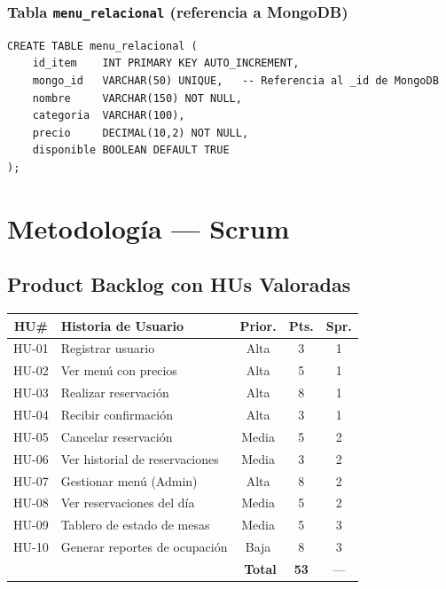 \documentclass[12pt,a4paper]{article}
\begin{document}
\subsubsection{Tabla \texttt{menu\_relacional} (referencia a MongoDB)}
\begin{lstlisting}[caption={SQL --- Tabla menu\_relacional}]
CREATE TABLE menu_relacional (
    id_item    INT PRIMARY KEY AUTO_INCREMENT,
    mongo_id   VARCHAR(50) UNIQUE,   -- Referencia al _id de MongoDB
    nombre     VARCHAR(150) NOT NULL,
    categoria  VARCHAR(100),
    precio     DECIMAL(10,2) NOT NULL,
    disponible BOOLEAN DEFAULT TRUE
);
\end{lstlisting}

\section{Metodología --- Scrum}



\subsection{Product Backlog con HUs Valoradas}

\begin{center}
{\small
\begin{tabular}{cp{7cm}ccc}
\toprule
\rowcolor{grisclaro}
\textbf{HU\#} & \textbf{Historia de Usuario} & \textbf{Prior.} & \textbf{Pts.} & \textbf{Spr.} \\
\midrule
HU-01 & Registrar usuario              & Alta  & 3  & 1 \\
\rowcolor{grisclaro}
HU-02 & Ver menú con precios           & Alta  & 5  & 1 \\
HU-03 & Realizar reservación           & Alta  & 8  & 1 \\
\rowcolor{grisclaro}
HU-04 & Recibir confirmación           & Alta  & 3  & 1 \\
HU-05 & Cancelar reservación           & Media & 5  & 2 \\
\rowcolor{grisclaro}
HU-06 & Ver historial de reservaciones & Media & 3  & 2 \\
HU-07 & Gestionar menú (Admin)         & Alta  & 8  & 2 \\
\rowcolor{grisclaro}
HU-08 & Ver reservaciones del día      & Media & 5  & 2 \\
HU-09 & Tablero de estado de mesas     & Media & 5  & 3 \\
\rowcolor{grisclaro}
HU-10 & Generar reportes de ocupación  & Baja  & 8  & 3 \\
\midrule
\multicolumn{3}{r}{\textbf{Total}} & \textbf{53} & --- \\
\bottomrule
\end{tabular}}
\end{center}
\end{document}
